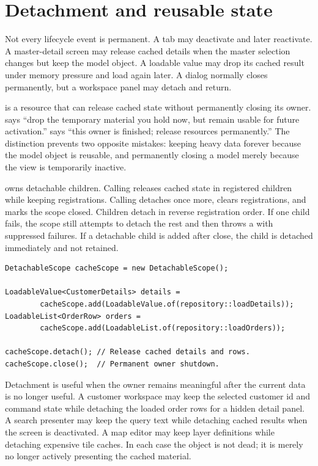 \section{Detachment and reusable state}

Not every lifecycle event is permanent. A tab may deactivate and later
reactivate. A master-detail screen may release cached details when the master
selection changes but keep the model object. A loadable value may drop its
cached result under memory pressure and load again later. A dialog normally
closes permanently, but a workspace panel may detach and return.

 is a resource that can release cached state
without permanently closing its owner.  says ``drop the
temporary material you hold now, but remain usable for future activation.''
 says ``this owner is finished; release resources
permanently.'' The distinction prevents two opposite mistakes: keeping heavy
data forever because the model object is reusable, and permanently closing a
model merely because the view is temporarily inactive.

 owns detachable children. Calling  releases
cached state in registered children while keeping registrations. Calling
 detaches once more, clears registrations, and marks the scope
closed. Children detach in reverse registration order. If one child fails, the
scope still attempts to detach the rest and then throws a 
with suppressed failures. If a detachable child is added after close, the child
is detached immediately and not retained.

\begin{lstlisting}[caption={Reusable cache lifecycle.}]
DetachableScope cacheScope = new DetachableScope();

LoadableValue<CustomerDetails> details =
        cacheScope.add(LoadableValue.of(repository::loadDetails));
LoadableList<OrderRow> orders =
        cacheScope.add(LoadableList.of(repository::loadOrders));

cacheScope.detach(); // Release cached details and rows.
cacheScope.close();  // Permanent owner shutdown.
\end{lstlisting}

Detachment is useful when the owner remains meaningful after the current data
is no longer useful. A customer workspace may keep the selected customer id and
command state while detaching the loaded order rows for a hidden detail panel.
A search presenter may keep the query text while detaching cached results when
the screen is deactivated. A map editor may keep layer definitions while
detaching expensive tile caches. In each case the object is not dead; it is
merely no longer actively presenting the cached material.


